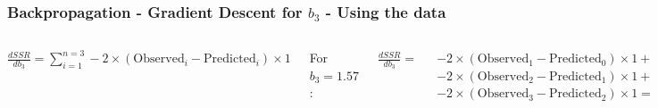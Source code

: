 \documentclass[aspectratio=169]{beamer}
\begin{document}
\begin{frame}[fragile]\frametitle{Backpropagation - Gradient Descent for $b_3$ - Using the data}
\begin{columns}
    $\displaystyle \frac{d SSR}{d b_3} =   \sum_{i=1}^{n=3} -2 \times (\mathrm{Observed}_i - \mathrm{Predicted}_i)\times 1$

    \vspace{3mm}
 
    For $b_3=1.57$:
    
    \vspace{3mm}
    
    $\displaystyle \frac{d SSR}{d b_3} = $
    
    $-2 \times (\mathrm{Observed}_1 - \mathrm{Predicted}_0)\times 1 +$
    $-2 \times (\mathrm{Observed}_2 - \mathrm{Predicted}_1)\times 1 +$
    $-2 \times (\mathrm{Observed}_3 - \mathrm{Predicted}_2)\times 1 =$
    \vspace{3mm}

    $-2 \times (0 - -1.03)\times 1 +$
    $-2 \times (1 - -0.03)\times 1 +$
    $-2 \times (0 - -1.04)\times 1 = -6.26$
    \vspace{3mm}

    $\mathrm{Step Size} = 0.1 \times -6.26 = -0.62$ (Learning Rate = 0.1)
    $\mathrm{New } b_3 = b_3 - \mathrm{Step Size} = 2.19$ 
    

\end{columns}
\end{frame}
\end{document}
